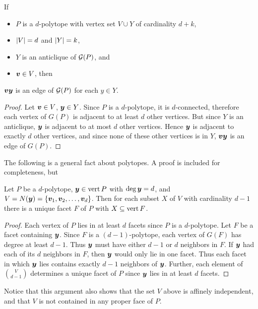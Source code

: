 \begin{Lemma}\label{Lem:LocalCone}
    If
        \begin{itemize}
            \item   \(P\) is a \(d\)-polytope with vertex set \(V\cup Y\) of cardinality \(d+k\),
            \item   \(\left\lvert V\right\rvert=d\) and \(\left\lvert Y\right\rvert=k\),
            \item   \(Y\) is an anticlique of \(\mathcal{G}(P)\), and
            \item   \(\bm{v}\in V\), then
        \end{itemize}
    \(\bm{v}\bm{y}\) is an edge of \(\mathcal{G}(P)\) for each \(y\in Y\).
\end{Lemma}
\begin{proof}
    Let \(\bm{v}\in V\), \(\bm{y}\in Y\).  Since \(P\) is a \(d\)-polytope, it is \(d\)-connected, therefore each vertex of \(G(P)\) is adjacent to at least \(d\) other vertices.  But since \(Y\) is an anticlique, \(\bm{y}\) is adjacent to at most \(d\) other vertices. Hence \(\bm{y}\) is adjacent to exactly \(d\) other vertices, and since none of these other vertices is in \(Y\), \(\bm{v}\bm{y}\) is an edge of \(G(P)\).
\end{proof}

    The following is a general fact about polytopes.  A proof is included for completeness, but
\begin{Lemma}\label{Lem:LocallySimple}
    Let \(P\) be a \(d\)-polytope, \(\bm{y}\in\operatorname{vert} P\) with \(\deg\bm{y}=d\), and \(V=N(\bm{y})=\left\{\bm{v}_1,\bm{v}_2,\dotsc,\bm{v}_d\right\}\).  Then for each subset \(X\) of \(V\) with cardinality \(d-1\) there is a unique facet \(F\) of \(P\) with \(X\subseteq\operatorname{vert} F\).
\end{Lemma}
\begin{proof}
    Each vertex of \(P\) lies in at least \(d\) facets since \(P\) is a \(d\)-polytope.  Let \(F\) be a facet containing \(\bm{y}\).  Since \(F\) is a \((d-1)\)-polytope, each vertex of \(G(F)\) has degree at least \(d-1\).  Thus \(\bm{y}\) must have either \(d-1\) or \(d\) neighbors in \(F\).  If \(\bm{y}\) had each of its \(d\) neighbors in \(F\), then \(\bm{y}\) would only lie in one facet.  Thus each facet in which \(\bm{y}\) lies contains exactly \(d-1\) neighbors of \(\bm{y}\).  Further, each element of \(\binom V{d-1}\) determines a unique facet of \(P\) since \(\bm{y}\) lies in at least \(d\) facets.
\end{proof}

Notice that this argument also shows that the set \(V\) above is affinely independent, and that \(V\) is not contained in any proper face of \(P\).

